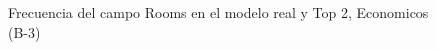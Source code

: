 \begin{figure}[H]
    \centering
    
    \caption{Frecuencia del campo Rooms en el modelo real y Top 2, Economicos (B-3)}
    \label{frecuency-Rooms-top2}
\end{figure}